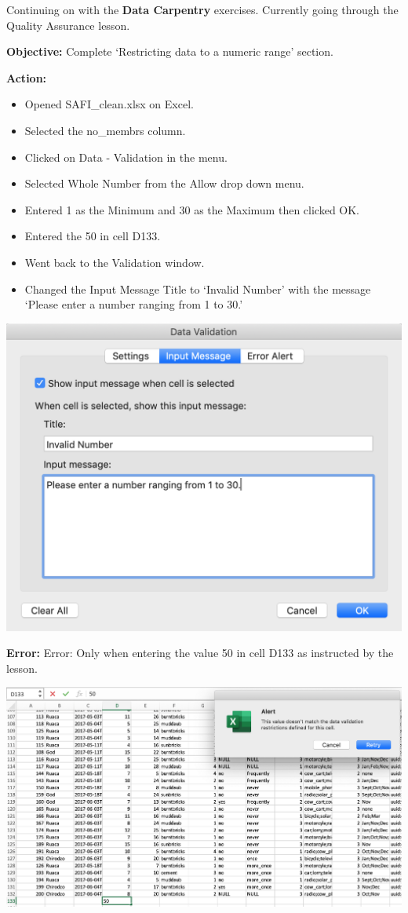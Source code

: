 \documentclass{article}
\begin{document}
Continuing on with the \textbf{Data Carpentry} exercises. Currently going through the Quality Assurance lesson.

\textbf{Objective:} Complete ‘Restricting data to a numeric range’ section.

\textbf{Action:}
\begin{itemize}
    \item Opened SAFI\_clean.xlsx on Excel.
    \item Selected the no\_membrs column.
    \item Clicked on Data - Validation in the menu.
    \item Selected Whole Number from the Allow drop down menu.
    \item Entered 1 as the Minimum and 30 as the Maximum then clicked OK.
    \item Entered the 50 in cell D133.
    \item Went back to the Validation window.
    \item Changed the Input Message Title to ‘Invalid Number’ with the message ‘Please enter a number ranging from 1 to 30.’
\end{itemize}

\includegraphics[width=\textwidth]{figa.png}

\textbf{Error:} Error: Only when entering the value 50 in cell D133 as instructed by the lesson.

\includegraphics[width=\textwidth]{figb.png}
\end{document}
